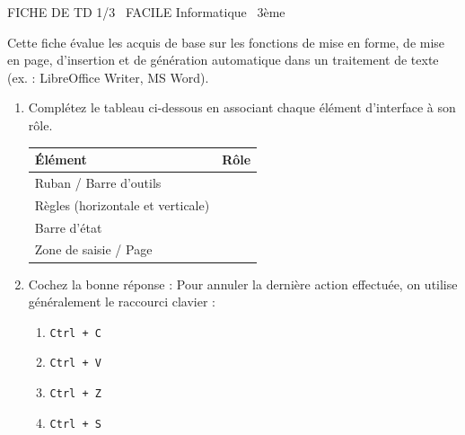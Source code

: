 \documentclass[11pt]{article}
\begin{document}
\begin{tcolorbox}[enhanced,colback=popink,colframe=popink,arc=10pt,boxrule=0pt,left=12pt,right=12pt,top=9pt,bottom=9pt]
{\color{white}\popxbold\small FICHE DE TD 1/3 \textbullet\ FACILE \hfill Informatique \textbullet\ 3ème\par}
\end{tcolorbox}
\vspace{4pt}
\noindent Cette fiche évalue les acquis de base sur les fonctions de mise en forme, de mise en page, d'insertion et de génération automatique dans un traitement de texte (ex. : LibreOffice Writer, MS Word).

\begin{exercice}
\begin{enumerate}
    \item Complétez le tableau ci-dessous en associant chaque élément d'interface à son rôle.
    \begin{tabular}{|p{4cm}|p{10cm}|}
    \hline
    \textbf{Élément} & \textbf{Rôle} \\ \hline
    Ruban / Barre d'outils & \\ \hline
    Règles (horizontale et verticale) & \\ \hline
    Barre d'état & \\ \hline
    Zone de saisie / Page & \\ \hline
    \end{tabular}
    \item Cochez la bonne réponse : Pour annuler la dernière action effectuée, on utilise généralement le raccourci clavier :
    \begin{enumerate}
        \item \texttt{Ctrl + C}
        \item \texttt{Ctrl + V}
        \item \texttt{Ctrl + Z}
        \item \texttt{Ctrl + S}
    \end{enumerate}
\end{enumerate}
\end{exercice}
\end{document}

